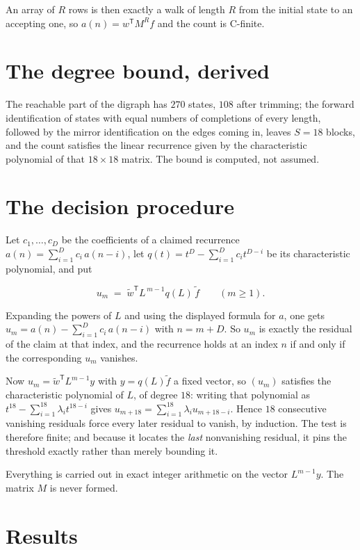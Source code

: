 \documentclass[11pt]{article}
\theoremstyle{definition}
\begin{document}
An array of $R$ rows is then exactly a walk of length $R$ from the initial state to an accepting one, so $a(n) = w^{\mathsf T}M^{R}f$ and the count is C-finite.

\section{The degree bound, derived}

The reachable part of the digraph has $270$ states, $108$ after trimming; the forward identification of states with equal numbers of completions of every length, followed by the mirror identification on the edges coming in, leaves $S = 18$ blocks, and the count satisfies the linear recurrence given by the characteristic polynomial of that $18\times18$ matrix. The bound is computed, not assumed.

\section{The decision procedure}

Let $c_1,\dots,c_D$ be the coefficients of a claimed recurrence $a(n) = \sum_{i=1}^{D} c_i\,a(n-i)$, let $q(t) = t^{D} - \sum_{i=1}^{D} c_i t^{D-i}$ be its characteristic polynomial, and put

\[u_m \;=\; \tilde w^{\mathsf T} L^{\,m-1} q(L)\,\tilde f \qquad (m \ge 1).\]

Expanding the powers of $L$ and using the displayed formula for $a$, one gets $u_m = a(n) - \sum_{i=1}^{D} c_i\,a(n-i)$ with $n = m + D$. So $u_m$ is exactly the residual of the claim at that index, and the recurrence holds at an index $n$ if and only if the corresponding $u_m$ vanishes.

Now $u_m = \tilde w^{\mathsf T} L^{m-1} y$ with $y = q(L)\tilde f$ a fixed vector, so $(u_m)$ satisfies the characteristic polynomial of $L$, of degree $18$: writing that polynomial as $t^{18} - \sum_{i=1}^{18} \lambda_i t^{18-i}$ gives $u_{m+18} = \sum_{i=1}^{18} \lambda_i u_{m+18-i}$. Hence $18$ consecutive vanishing residuals force every later residual to vanish, by induction. The test is therefore finite; and because it locates the {\itshape last} nonvanishing residual, it pins the threshold exactly rather than merely bounding it.

Everything is carried out in exact integer arithmetic on the vector $L^{m-1}y$. The matrix $M$ is never formed.

\section{Results}
\end{document}
